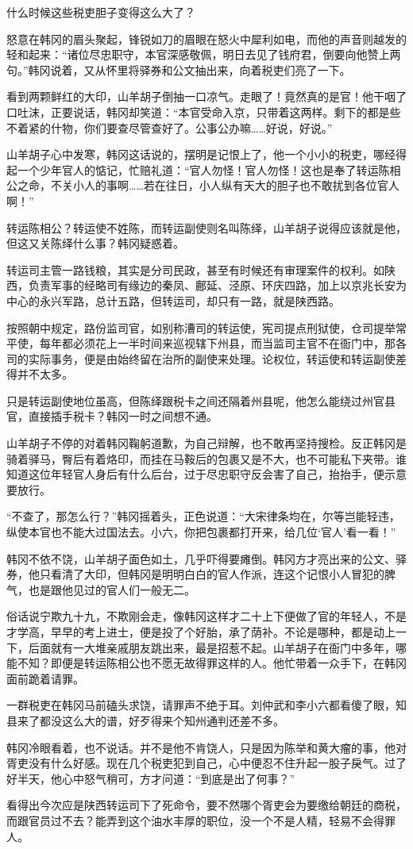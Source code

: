 什么时候这些税吏胆子变得这么大了？

怒意在韩冈的眉头聚起，锋锐如刀的眉眼在怒火中犀利如电，而他的声音则越发的轻和起来：“诸位尽忠职守，本官深感敬佩，明日去见了钱府君，倒要向他赞上两句。”韩冈说着，又从怀里将驿券和公文抽出来，向着税吏们亮了一下。

看到两颗鲜红的大印，山羊胡子倒抽一口凉气。走眼了！竟然真的是官！他干咽了口吐沫，正要说话，韩冈却笑道：“本官受命入京，只带着这两样。剩下的都是些不着紧的什物，你们要查尽管查好了。公事公办嘛……好说，好说。”

山羊胡子心中发寒，韩冈这话说的，摆明是记恨上了，他一个小小的税吏，哪经得起一个少年官人的惦记，忙赔礼道：“官人勿怪！官人勿怪！这也是奉了转运陈相公之命，不关小人的事啊……若在往日，小人纵有天大的胆子也不敢扰到各位官人啊！”

转运陈相公？转运使不姓陈，而转运副使则名叫陈绎，山羊胡子说得应该就是他，但这又关陈绎什么事？韩冈疑惑着。

转运司主管一路钱粮，其实是分司民政，甚至有时候还有审理案件的权利。如陕西，负责军事的经略司有缘边的秦凤、鄜延、泾原、环庆四路，加上以京兆长安为中心的永兴军路，总计五路，但转运司，却只有一路，就是陕西路。

按照朝中规定，路份监司官，如别称漕司的转运使，宪司提点刑狱使，仓司提举常平使，每年都必须花上一半时间来巡视辖下州县，而当监司主官不在衙门中，那各司的实际事务，便是由始终留在治所的副使来处理。论权位，转运使和转运副使差得并不太多。

只是转运副使地位虽高，但陈绎跟税卡之间还隔着州县呢，他怎么能绕过州官县官，直接插手税卡？韩冈一时之间想不通。

山羊胡子不停的对着韩冈鞠躬道歉，为自己辩解，也不敢再坚持搜检。反正韩冈是骑着驿马，臀后有着烙印，而挂在马鞍后的包裹又是不大，也不可能私下夹带。谁知道这位年轻官人身后有什么后台，过于尽忠职守反会害了自己，抬抬手，便示意要放行。

“不查了，那怎么行？”韩冈摇着头，正色说道：“大宋律条均在，尔等岂能轻违，纵使本官也不能大过国法去。小六，你把包裹都打开来，给几位‘官人’看一看！”

韩冈不依不饶，山羊胡子面色如土，几乎吓得要瘫倒。韩冈方才亮出来的公文、驿券，他只看清了大印，但韩冈是明明白白的官人作派，连这个记恨小人冒犯的脾气，也是跟他见过的官人们一般无二。

俗话说宁欺九十九，不欺刚会走，像韩冈这样才二十上下便做了官的年轻人，不是才学高，早早的考上进士，便是投了个好胎，承了荫补。不论是哪种，都是动上一下，后面就有一大堆亲戚朋友跳出来，最是招惹不起。山羊胡子在衙门中多年，哪能不知？即便是转运陈相公也不愿无故得罪这样的人。他忙带着一众手下，在韩冈面前跪着请罪。

一群税吏在韩冈马前磕头求饶，请罪声不绝于耳。刘仲武和李小六都看傻了眼，知县来了都没这么大的谱，好歹得来个知州通判还差不多。

韩冈冷眼看着，也不说话。并不是他不肯饶人，只是因为陈举和黄大瘤的事，他对胥吏没有什么好感。现在几个税吏犯到自己，心中便忍不住升起一股子戾气。过了好半天，他心中怒气稍可，方才问道：“到底是出了何事？”

看得出今次应是陕西转运司下了死命令，要不然哪个胥吏会为要缴给朝廷的商税，而跟官员过不去？能弄到这个油水丰厚的职位，没一个不是人精，轻易不会得罪人。

